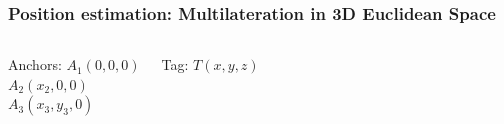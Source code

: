 \documentclass[10pt]{beamer}
\begin{document}
\begin{frame}
    \frametitle{Position estimation: Multilateration in 3D Euclidean Space}
    \begin{columns}
        \begin{columns}
            Anchors:
            $A_1(0,0,0)$\\
            $A_2(x_2,0,0)$\\
            $A_3(x_3,y_3,0)$
        \end{columns}
        \begin{columns}
            Tag:
            $T(x,y,z)$
        \end{columns}



\end{columns}
\end{frame}
\end{document}
